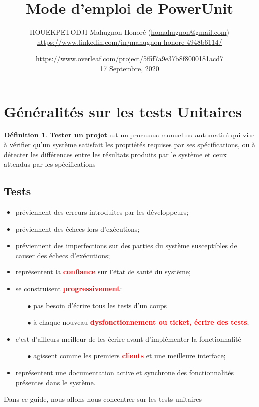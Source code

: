 \documentclass[a4paper,11pt,french]{report}
\title{Mode d'emploi de PowerUnit}
\author{HOUEKPETODJI Mahugnon Honoré (\url{homahugnon@gmail.com})\\\url{https://www.linkedin.com/in/mahugnon-honore-4948b6114/}}
\date{\url{https://www.overleaf.com/project/5f5f7a9e37b8f8000181acd7}\\17 Septembre, 2020}
\theoremstyle{definition}
\newtheorem{definition}{Définition}[section]
\begin{document}
\maketitle



\tableofcontents
\clearpage

\section{Généralités sur les tests Unitaires}

\theoremstyle{definition}
\begin{definition}{\textbf{Tester un projet}}
 est un processus manuel ou automatisé qui vise à vérifier qu'un système satisfait les propriétés requises par ses spécifications, ou à détecter les différences entre les résultats produits par le système et ceux attendus par les spécifications
\end{definition}
\subsection{Tests}
\begin{itemize}
    \item préviennent des erreurs introduites par les développeurs;
    \item préviennent des échecs lors d'exécutions;
    \item préviennent des imperfections sur des parties du système susceptibles de causer des échecs d'exécutions;
    \item représentent la \textbf{\textcolor{red}{confiance}} sur l'état de santé du système;
    \item se construisent \textbf{\textcolor{red}{progressivement}}:
    \begin{itemize}
        \item[$\bullet$] pas besoin d'écrire tous les tests d'un coups
        \item[$\bullet$] à chaque nouveau  \textbf{\textcolor{red}{dysfonctionnement ou ticket, écrire des tests}};
    \end{itemize}
    \item c'est d'ailleurs meilleur de les écrire avant d'implémenter la fonctionnalité 
    \begin{itemize}
        \item[$\bullet$] agissent comme les premiers \textbf{\textcolor{red}{clients}} et une meilleure interface; 
    \end{itemize}
    \item représentent une documentation active et synchrone des fonctionnalités présentes dans le système.
    
\end{itemize}
Dans ce guide, nous allons nous concentrer sur les tests unitaires
\end{document}
